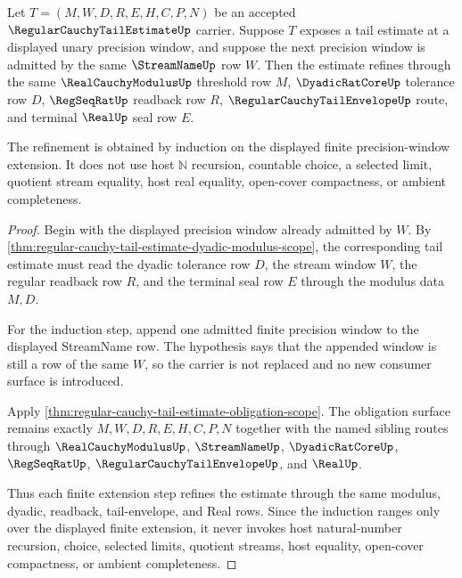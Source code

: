 \begin{theorem}
\label{thm:regular-cauchy-tail-estimate-finite-induction}
Let $T=(M,W,D,R,E,H,C,P,N)$ be an accepted $\RegularCauchyTailEstimateUp$ carrier. Suppose $T$ exposes a tail estimate at a displayed unary precision window, and suppose the next precision window is admitted by the same $\StreamNameUp$ row $W$. Then the estimate refines through the same $\RealCauchyModulusUp$ threshold row $M$, $\DyadicRatCoreUp$ tolerance row $D$, $\RegSeqRatUp$ readback row $R$, $\RegularCauchyTailEnvelopeUp$ route, and terminal $\RealUp$ seal row $E$.

The refinement is obtained by induction on the displayed finite precision-window extension. It does not use host $\mathbb{N}$ recursion, countable choice, a selected limit, quotient stream equality, host real equality, open-cover compactness, or ambient completeness.
\end{theorem}
\begin{proof}
Begin with the displayed precision window already admitted by $W$. By \autoref{thm:regular-cauchy-tail-estimate-dyadic-modulus-scope}, the corresponding tail estimate must read the dyadic tolerance row $D$, the stream window $W$, the regular readback row $R$, and the terminal seal row $E$ through the modulus data $M,D$.

For the induction step, append one admitted finite precision window to the displayed StreamName row. The hypothesis says that the appended window is still a row of the same $W$, so the carrier is not replaced and no new consumer surface is introduced.

Apply \autoref{thm:regular-cauchy-tail-estimate-obligation-scope}. The obligation surface remains exactly $M,W,D,R,E,H,C,P,N$ together with the named sibling routes through $\RealCauchyModulusUp$, $\StreamNameUp$, $\DyadicRatCoreUp$, $\RegSeqRatUp$, $\RegularCauchyTailEnvelopeUp$, and $\RealUp$.

Thus each finite extension step refines the estimate through the same modulus, dyadic, readback, tail-envelope, and Real rows. Since the induction ranges only over the displayed finite extension, it never invokes host natural-number recursion, choice, selected limits, quotient streams, host equality, open-cover compactness, or ambient completeness.
\end{proof}

